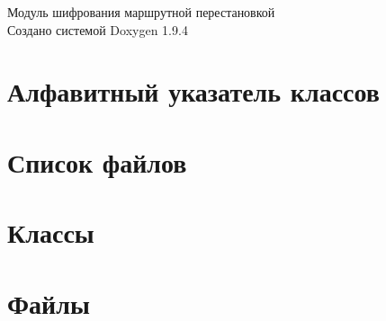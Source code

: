 \documentclass[twoside]{book}
\newcommand{\+}{\discretionary{\mbox{\scriptsize$\hookleftarrow$}}{}{}}
\newcommand{\clearemptydoublepage}{%
    \newpage{\pagestyle{empty}\cleardoublepage}%
  }
\begin{document}
  \raggedbottom
    \hypersetup{pageanchor=false,
                bookmarksnumbered=true,
                pdfencoding=unicode
               }
  \begin{titlepage}
  \vspace*{7cm}
  \begin{center}%
  {\Large Модуль шифрования маршрутной перестановкой}\\
  \vspace*{1cm}
  {\large Создано системой Doxygen 1.9.4}\\
  \end{center}
  \end{titlepage}
  \clearemptydoublepage
  \tableofcontents
  \clearemptydoublepage
  \hypersetup{pageanchor=true}
\chapter{Алфавитный указатель классов}

\chapter{Список файлов}

\chapter{Классы}

\chapter{Файлы}






  \backmatter
  \newpage
  \clearemptydoublepage
  \printindex
\end{document}
